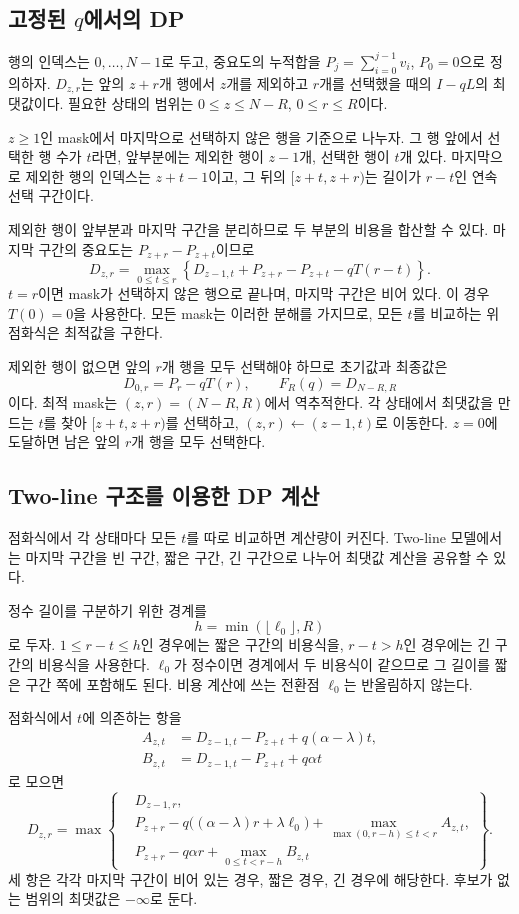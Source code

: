 \subsection{고정된 \texorpdfstring{$q$}{q}에서의 DP}\label{sec:dp-fixed-q}

행의 인덱스는 $0,\ldots,N-1$로 두고, 중요도의 누적합을 $P_j=\sum_{i=0}^{j-1}v_i$, $P_0=0$으로 정의하자. $D_{z,r}$는 앞의 $z+r$개 행에서 $z$개를 제외하고 $r$개를 선택했을 때의 $I-qL$의 최댓값이다. 필요한 상태의 범위는 $0\le z\le N-R$, $0\le r\le R$이다.

$z\ge1$인 mask에서 마지막으로 선택하지 않은 행을 기준으로 나누자. 그 행 앞에서 선택한 행 수가 $t$라면, 앞부분에는 제외한 행이 $z-1$개, 선택한 행이 $t$개 있다. 마지막으로 제외한 행의 인덱스는 $z+t-1$이고, 그 뒤의 $[z+t,z+r)$는 길이가 $r-t$인 연속 선택 구간이다.

제외한 행이 앞부분과 마지막 구간을 분리하므로 두 부분의 비용을 합산할 수 있다. 마지막 구간의 중요도는 $P_{z+r}-P_{z+t}$이므로
\[
\boxed{
D_{z,r}
=\max_{0\le t\le r}
\left\{
D_{z-1,t}
+P_{z+r}-P_{z+t}
-qT(r-t)
\right\}.
}
\]
$t=r$이면 mask가 선택하지 않은 행으로 끝나며, 마지막 구간은 비어 있다. 이 경우 $T(0)=0$을 사용한다. 모든 mask는 이러한 분해를 가지므로, 모든 $t$를 비교하는 위 점화식은 최적값을 구한다.

제외한 행이 없으면 앞의 $r$개 행을 모두 선택해야 하므로 초기값과 최종값은
\[
D_{0,r}=P_r-qT(r),
\qquad
F_R(q)=D_{N-R,R}
\]
이다. 최적 mask는 $(z,r)=(N-R,R)$에서 역추적한다. 각 상태에서 최댓값을 만드는 $t$를 찾아 $[z+t,z+r)$를 선택하고, $(z,r)\leftarrow(z-1,t)$로 이동한다. $z=0$에 도달하면 남은 앞의 $r$개 행을 모두 선택한다.

\subsection{Two-line 구조를 이용한 DP 계산}\label{sec:dp-two-line}

점화식에서 각 상태마다 모든 $t$를 따로 비교하면 계산량이 커진다. Two-line 모델에서는 마지막 구간을 빈 구간, 짧은 구간, 긴 구간으로 나누어 최댓값 계산을 공유할 수 있다.

정수 길이를 구분하기 위한 경계를
\[
h=\min(\lfloor\ell_0\rfloor,R)
\]
로 두자. $1\le r-t\le h$인 경우에는 짧은 구간의 비용식을, $r-t>h$인 경우에는 긴 구간의 비용식을 사용한다. $\ell_0$가 정수이면 경계에서 두 비용식이 같으므로 그 길이를 짧은 구간 쪽에 포함해도 된다. 비용 계산에 쓰는 전환점 $\ell_0$는 반올림하지 않는다.

점화식에서 $t$에 의존하는 항을
\[
\begin{aligned}
A_{z,t}&=D_{z-1,t}-P_{z+t}+q(\alpha-\lambda)t,\\
B_{z,t}&=D_{z-1,t}-P_{z+t}+q\alpha t
\end{aligned}
\]
로 모으면
\[
D_{z,r}=
\max\left\{
\begin{aligned}
&D_{z-1,r},\\
&P_{z+r}-q\bigl((\alpha-\lambda)r+\lambda\ell_0\bigr)
+\max_{\max(0,r-h)\le t<r}A_{z,t},\\
&P_{z+r}-q\alpha r
+\max_{0\le t<r-h}B_{z,t}
\end{aligned}
\right\}.
\]
세 항은 각각 마지막 구간이 비어 있는 경우, 짧은 경우, 긴 경우에 해당한다. 후보가 없는 범위의 최댓값은 $-\infty$로 둔다.

